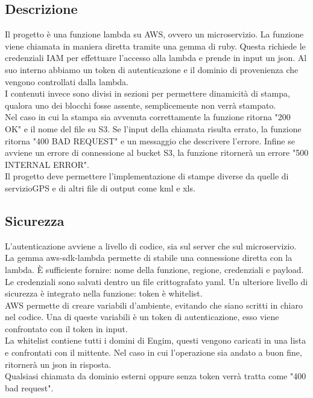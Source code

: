 \documentclass[12pt]{article}
\begin{document}
\subsection{Descrizione}
Il progetto è una funzione lambda su AWS, ovvero un microservizio. La funzione 
viene chiamata in maniera diretta tramite una gemma di ruby.
Questa richiede le credenziali IAM per effettuare l'accesso alla lambda e prende 
in input un json. Al suo interno abbiamo un token di autenticazione e il dominio 
di provenienza che vengono controllati dalla lambda. 
\\ I contenuti invece sono divisi in sezioni per permettere dinamicità di stampa, 
qualora uno dei blocchi fosse assente, semplicemente non verrà stampato. 
\\ Nel caso in cui la stampa sia avvenuta correttamente la funzione ritorna 
"200 OK"
e il nome del file su S3. Se l'input della chiamata risulta errato, la funzione ritorna 
"400 BAD REQUEST"
e un messaggio che descrivere l'errore. Infine se avviene un errore di connessione 
al bucket S3, la funzione ritornerà un errore "500 INTERNAL ERROR".    
\\ Il progetto deve permettere l'implementazione di stampe diverse da quelle di servizioGPS
e di altri file di output come kml e xls. 



\subsection{Sicurezza}
L'autenticazione avviene a livello di codice, sia sul server che sul microservizio.
\\ La gemma aws-sdk-lambda permette di stabile una connessione diretta con la 
lambda. È sufficiente fornire: nome della funzione, regione, credenziali e payload. 
Le credenziali sono salvati dentro un file crittografato yaml. 
Un ulteriore livello di sicurezza è integrato nella funzione: token è whitelist. 
\\ AWS permette di creare variabili
d'ambiente, evitando che siano scritti in chiaro nel codice. Una di queste variabili 
è un token di autenticazione, esso viene confrontato con il token in input. 
\\ La whitelist contiene tutti i domini di Engim, questi vengono caricati in 
una lista e confrontati con il mittente. 
Nel caso in cui 
l'operazione sia andato a buon fine, ritornerà un json in risposta.
\\ Qualsiasi chiamata da dominio esterni oppure senza token verrà tratta come 
"400 bad request". 
\end{document}
